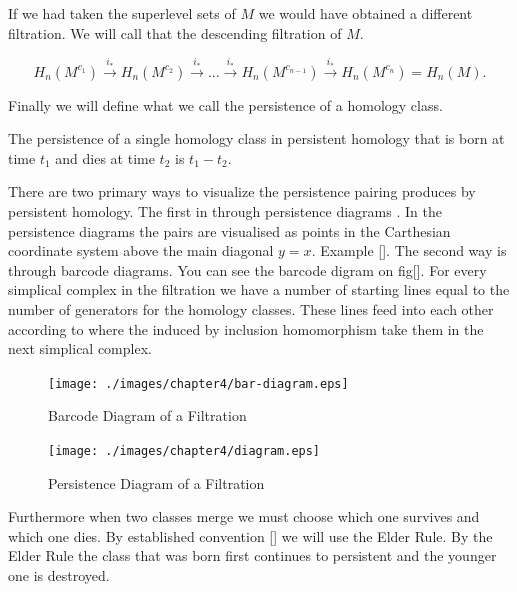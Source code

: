If we had taken the superlevel sets of $M$ we would have obtained a different filtration. We will call that the descending filtration of $M$.

$$ H_n(M^{c_1}) \overset{i_*}{\longrightarrow} H_n(M^{c_2}) \overset{i_*}{\longrightarrow} ... \overset{i_*}{\longrightarrow} H_n(M^{c_{n-1}}) \overset{i_*}{\longrightarrow} H_n(M^{c_n}) = H_n(M).$$




Finally we will define what we call the persistence of a homology class.

\begin{defn} The persistence of a single homology class in persistent homology that is born at time $t_1$ and dies at time $t_2$ is $t_1 - t_2$.  \end{defn}

    There are two primary ways to visualize the persistence pairing produces by persistent homology. The first in through persistence diagrams \cite{comp-topo}. In the persistence diagrams the pairs are visualised as points in the Carthesian coordinate system above the main diagonal $y = x$. Example []. The second way is through barcode diagrams. You can see the barcode digram on fig[]. For every simplical complex in the filtration we have a number of starting lines equal to the number of generators for the homology classes. These lines feed into each other according to where the induced by inclusion homomorphism take them in the next simplical complex. 

\begin{figure}[h]%
    \centering
    \texttt{[image: ./images/chapter4/bar-diagram.eps]}%
    \caption{Barcode Diagram of a Filtration}%
    \label{fig:bar-diag}%
\end{figure}

\begin{figure}[h]%
    \centering
    \texttt{[image: ./images/chapter4/diagram.eps]}%
    \caption{Persistence Diagram of a Filtration}%
    \label{fig:per-diag}%
\end{figure}


Furthermore when two classes merge we must choose which one survives and which one dies. By established convention [] we will use the Elder Rule. By the Elder Rule the class that was born first continues to persistent and the younger one is destroyed.




